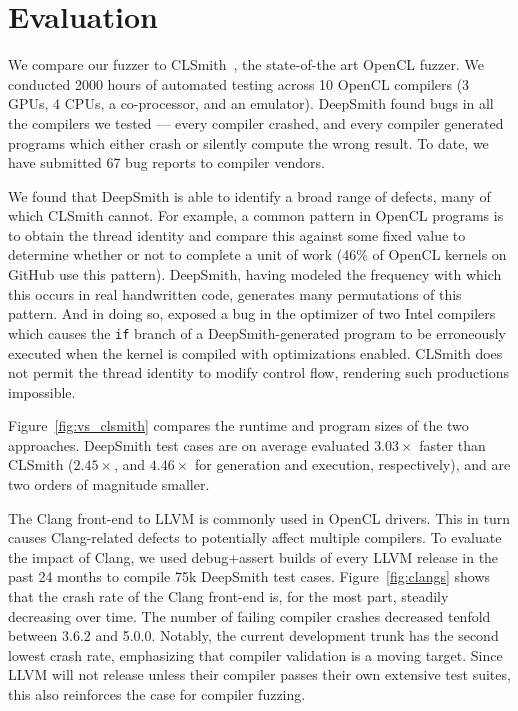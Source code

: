 \section{Evaluation}%

We compare our fuzzer to CLSmith~\cite{Lidbury2015a}, the state-of-the art OpenCL fuzzer. We conducted 2000 hours of automated testing across 10 OpenCL compilers (3 GPUs, 4 CPUs, a co-processor, and an emulator). DeepSmith found bugs in all the compilers we tested --- every compiler crashed, and every compiler generated programs which either crash or silently compute the wrong result. To date, we have submitted 67 bug reports to compiler vendors.

We found that DeepSmith is able to identify a broad range of defects, many of which CLSmith cannot. For example, a common pattern in OpenCL programs is to obtain the thread identity and compare this against some fixed value to determine whether or not to complete a unit of work (46\% of OpenCL kernels on GitHub use this pattern). DeepSmith, having modeled the frequency with which this occurs in real handwritten code, generates many permutations of this pattern. And in doing so, exposed a bug in the optimizer of two Intel compilers which causes the \texttt{if} branch of a DeepSmith-generated program to be erroneously executed when the kernel is compiled with optimizations enabled. CLSmith does not permit the thread identity to modify control flow, rendering such productions impossible.

Figure~\ref{fig:vs_clsmith} compares the runtime and program sizes of the two approaches. DeepSmith test cases are on average evaluated $3.03\times$ faster than CLSmith ($2.45\times$, and $4.46\times$ for generation and execution, respectively), and are two orders of magnitude smaller.

The Clang front-end to LLVM is commonly used in OpenCL drivers. This in turn causes Clang-related defects to potentially affect multiple compilers. To evaluate the impact of Clang, we used debug+assert builds of every LLVM release in the past 24 months to compile 75k DeepSmith test cases. Figure~\ref{fig:clangs} shows that the crash rate of the Clang front-end is, for the most part, steadily decreasing over time. The number of failing compiler crashes decreased tenfold between 3.6.2 and 5.0.0. Notably, the current development trunk has the second lowest crash rate, emphasizing that compiler validation is a moving target. Since LLVM will not release unless their compiler passes their own extensive test suites, this also reinforces the case for compiler fuzzing.

\vspace{-1em}